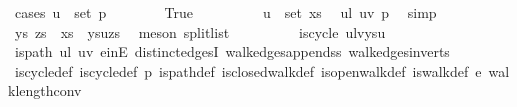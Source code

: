 \begin{isabellebody}
\ {\isacharparenleft}{\kern0pt}cases\ {\isachardoublequoteopen}u\ {\isasymin}\ set\ p{\isachardoublequoteclose}{\isacharparenright}{\kern0pt}\isanewline
\ \ \ \ \ \ \isamarkupfalse%
\ True\isanewline
\ \ \ \ \ \ \isamarkupfalse%
\ \isamarkupfalse%
\ {\isachardoublequoteopen}u\ {\isasymin}\ set\ xs{\isachardoublequoteclose}\ \isamarkupfalse%
\ {\isacartoucheopen}u{\isasymnoteq}l{\isacartoucheclose}\ {\isacartoucheopen}u{\isasymnoteq}v{\isacartoucheclose}\ p\ \isamarkupfalse%
\ simp\isanewline
\ \ \ \ \ \ \isamarkupfalse%
\ \isamarkupfalse%
\ ys\ zs\ \ {\isachardoublequoteopen}xs\ {\isacharequal}{\kern0pt}\ ys{\isacharat}{\kern0pt}u{\isacharhash}{\kern0pt}zs{\isachardoublequoteclose}\ \isamarkupfalse%
\ {\isacharparenleft}{\kern0pt}meson\ split{\isacharunderscore}{\kern0pt}list{\isacharparenright}{\kern0pt}\isanewline
\ \ \ \ \ \ \isamarkupfalse%
\ \isamarkupfalse%
\ {\isachardoublequoteopen}is{\isacharunderscore}{\kern0pt}cycle{}\ {\isacharparenleft}{\kern0pt}u{\isacharhash}{\kern0pt}l{\isacharhash}{\kern0pt}v{\isacharhash}{\kern0pt}ys{\isacharat}{\kern0pt}{\isacharbrackleft}{\kern0pt}u{\isacharbrackright}{\kern0pt}{\isacharparenright}{\kern0pt}{\isachardoublequoteclose}\isanewline
\ \ \ \ \ \ \ \ \isamarkupfalse%
\ is{\isacharunderscore}{\kern0pt}path\ {\isacartoucheopen}u{\isasymnoteq}l{\isacartoucheclose}\ {\isacartoucheopen}u{\isasymnoteq}v{\isacartoucheclose}\ e{\isacharunderscore}{\kern0pt}in{\isacharunderscore}{\kern0pt}E\ distinct{\isacharunderscore}{\kern0pt}edgesI\ walk{\isacharunderscore}{\kern0pt}edges{\isacharunderscore}{\kern0pt}append{\isacharunderscore}{\kern0pt}ss{}\ walk{\isacharunderscore}{\kern0pt}edges{\isacharunderscore}{\kern0pt}in{\isacharunderscore}{\kern0pt}verts\isanewline
\ \ \ \ \ \ \ \ \isamarkupfalse%
\ is{\isacharunderscore}{\kern0pt}cycle{}{\isacharunderscore}{\kern0pt}def\ is{\isacharunderscore}{\kern0pt}cycle{\isacharunderscore}{\kern0pt}def\ p\ is{\isacharunderscore}{\kern0pt}path{\isacharunderscore}{\kern0pt}def\ is{\isacharunderscore}{\kern0pt}closed{\isacharunderscore}{\kern0pt}walk{\isacharunderscore}{\kern0pt}def\ is{\isacharunderscore}{\kern0pt}open{\isacharunderscore}{\kern0pt}walk{\isacharunderscore}{\kern0pt}def\ is{\isacharunderscore}{\kern0pt}walk{\isacharunderscore}{\kern0pt}def\ e\ walk{\isacharunderscore}{\kern0pt}length{\isacharunderscore}{\kern0pt}conv\isanewline

\end{isabellebody}
